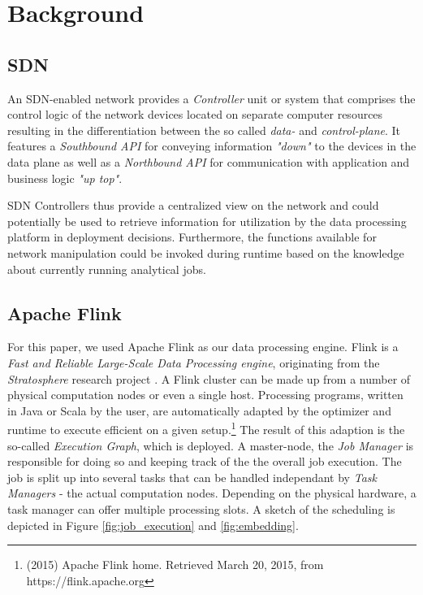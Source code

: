 \section{Background}
\subsection{SDN}
An SDN-enabled network provides a \textit{Controller} unit or system that comprises the control
logic of the network devices located on separate computer resources resulting in the differentiation
between the so called \textit{data-} and \textit{control-plane}. It features a \textit{Southbound
API} for conveying information \emph{"down"} to the devices in the data plane as well as a
\textit{Northbound API} for communication with application and business logic \emph{"up top"}.

SDN Controllers thus provide a centralized view on the network and could potentially be used to
retrieve information for utilization by the data processing platform in deployment decisions.
Furthermore, the functions available for network manipulation could be invoked during runtime based
on the knowledge about currently running analytical jobs.

\subsection{Apache Flink}
For this paper, we used Apache Flink as our data processing engine. Flink is a \textit{Fast and
Reliable Large-Scale Data Processing engine}, originating from the \textit{Stratosphere} research
project \cite{stratosphere}. A Flink cluster can be made up from a number of
physical computation nodes or even a single host. Processing programs, written in Java or Scala by
the user, are automatically adapted by the optimizer and runtime to execute efficient on a given
setup.\footnote{(2015) Apache Flink home. Retrieved March 20, 2015, from https://flink.apache.org}
The result of this adaption is the so-called \textit{Execution Graph}, which is deployed. A
master-node, the \textit{Job Manager} is responsible for doing so and keeping track of the the
overall job execution. The job is split up into several tasks that can be handled independant by
\textit{Task Managers} - the actual computation nodes. Depending on the physical hardware, a task
manager can offer multiple processing slots. A sketch of the scheduling is depicted in Figure
\ref{fig:job_execution} and \ref{fig:embedding}.

